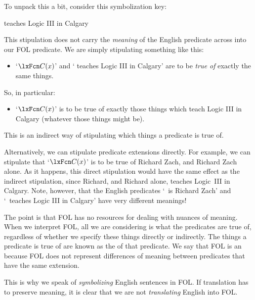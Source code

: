 To unpack this a bit, consider this symbolization key: 
	\begin{ekey}
		\item[\atom{C}{x}]  teaches Logic III in Calgary
	\end{ekey} 
This stipulation does not carry the \emph{meaning} of the English predicate across into our FOL predicate. We are simply stipulating something like this:
	\begin{itemize}
		\item `$\atom{C}{x}$' and ` teaches Logic III in Calgary' are to be \emph{true of} exactly the same things.
	\end{itemize}
So, in particular:
	\begin{itemize}
		\item `$\atom{C}{x}$' is to be true of exactly those things which teach Logic III in Calgary (whatever those things might be).
	\end{itemize}
This is an indirect way of stipulating which things a predicate is true of.

Alternatively, we can stipulate predicate extensions directly. For example, we can stipulate that `$\atom{C}{x}$' is to be true of Richard Zach, and Richard Zach alone. As it happens, this direct stipulation would have the same effect as the indirect stipulation, since Richard, and Richard alone, teaches Logic~III in Calgary. Note, however, that the English predicates `\blank\ is Richard Zach' and `\blank\ teaches Logic III in Calgary' have very different meanings!

The point is that FOL has no resources for dealing with nuances of meaning. When we interpret FOL, all we are considering is what the predicates are true of, regardless of whether we specify these things directly or indirectly. The things a predicate is true of are known as the  of that predicate. We say that FOL is an  because FOL does not represent differences of meaning between predicates that have the same extension.

This is why we speak of \emph{symbolizing} English sentences in FOL.
If translation has to preserve meaning, it is clear that we are not \emph{translating} English into FOL.

